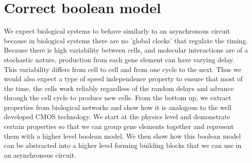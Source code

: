 \documentclass{article}
\begin{document}
\section{Correct boolean model}
We expect biological systems to behave similarly to an asynchronous circuit because in biological systems there are no 'global clocks' that regulate the timing.  Because there is high variability between cells, and molecular interactions are of a stochastic nature, production from each gene element can have varying delay.  This variability differs from cell to cell and from one cycle to the next. Thus we would also expect a type of speed independence property to ensure that most of the time, the cells work reliably regardless of the random delays and advance through the cell cycle to produce new cells.
\newline \newline
From the bottom up, we extract properties from biological networks and show how it is analogous to the well developed CMOS technology.  We start at the physics level and demonstrate certain properties so that we can group gene elements together and represent them with a higher level boolean model.  We then show how this boolean model can be abstracted into a higher level forming building blocks that we can use in an asynchronous circuit. 
\newline \newline
\end{document}
